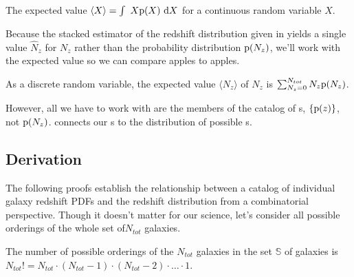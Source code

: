 

\begin{definition}\label{def:expected}
	The expected value $\langle X \rangle = \int\ X\mathrm{p}(X)\ \mathrm{d} X$ for a continuous random variable $X$.
\end{definition}

Because the stacked estimator of the redshift distribution given in  yields a single value $\hat{N}_{z}$ for $N_{z}$ rather than the probability distribution $\mathrm{p}(N_{z})$, we'll work with the expected value so we can compare apples to apples.

\begin{lemma}\label{lem:expectednz}
	As a discrete random variable, the expected value $\langle N_{z} \rangle$ of $N_{z}$ is $\sum_{N_{z} = 0}^{N_{tot}} N_{z}\mathrm{p}(N_{z})$.
\end{lemma}

However, all we have to work with are the members of the catalog of \pzpdf s, $\{\mathrm{p}(z)\}$, not $\mathrm{p}(N_{z})$.
 connects our \pzpdf s to the distribution of possible \Nz s.

\subsection{Derivation}

The following proofs establish the relationship between a catalog of individual galaxy redshift PDFs and the redshift distribution from a combinatorial perspective.
Though it doesn't matter for our science, let's consider all possible orderings of the whole set of$N_{tot}$ galaxies.

\begin{definition}\label{def:permutations}
	The number of possible orderings of the $N_{tot}$ galaxies in the set $\mathbb{S}$ of galaxies is $N_{tot}! = N_{tot} \cdot (N_{tot} - 1) \cdot (N_{tot} - 2) \cdot \dots \cdot 1$.
\end{definition}

